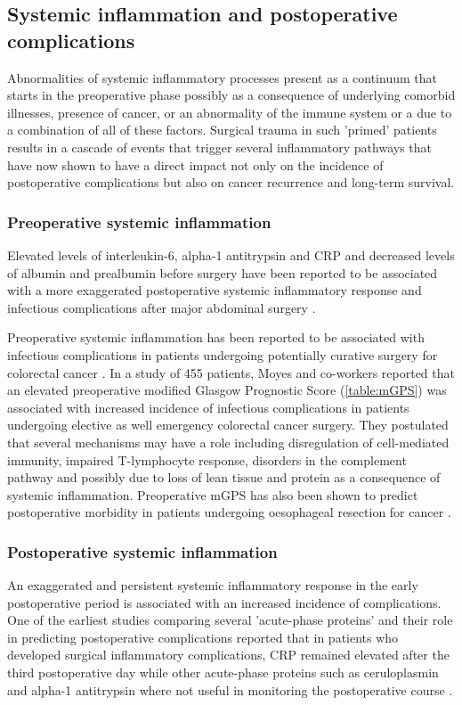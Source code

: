 \subsection{Systemic inflammation and postoperative complications}

Abnormalities of systemic inflammatory processes present as a continuum that starts in the preoperative phase possibly as a consequence of underlying comorbid illnesses, presence of cancer, or an abnormality of the immune system or a due to a combination of all of these factors. 
Surgical trauma in such 'primed' patients results in a cascade of events that trigger several inflammatory pathways that have now shown to have a direct impact not only on the incidence of postoperative complications but also on cancer recurrence and long-term survival.

\subsubsection{Preoperative systemic inflammation}
Elevated levels of interleukin-6, alpha-1 antitrypsin and CRP and decreased levels of albumin and prealbumin before surgery have been reported to be associated with a more exaggerated postoperative systemic inflammatory response and infectious complications after major abdominal surgery \parencite{haupt_association_1997}. 

Preoperative systemic inflammation has been reported to be associated with infectious complications in patients undergoing potentially curative surgery for colorectal cancer \parencite{moyes_preoperative_2009}. 
In a study of 455 patients, Moyes and co-workers reported that an elevated preoperative modified Glasgow Prognostic Score (\ref{table:mGPS}) was associated with increased incidence of infectious complications in patients undergoing elective as well emergency colorectal cancer surgery. 
They postulated that several mechanisms may have a role including disregulation of cell-mediated immunity, impaired T-lymphocyte response, disorders in the complement pathway and possibly due to loss of lean tissue and protein as a consequence of systemic inflammation. 
Preoperative mGPS has also been shown to predict postoperative morbidity in patients undergoing oesophageal resection for cancer \parencite{vashist_glasgow_2010}. 

\subsubsection{Postoperative systemic inflammation}
An exaggerated and persistent systemic inflammatory response in the early postoperative period is associated with an increased incidence of complications. 
One of the earliest studies comparing several 'acute-phase proteins' and their role in predicting postoperative complications reported that in patients who developed surgical inflammatory complications, CRP remained elevated after the third postoperative day while other acute-phase proteins such as ceruloplasmin and alpha-1 antitrypsin where not useful in monitoring the postoperative course \parencite{fischer_quantitation_1976}. 

